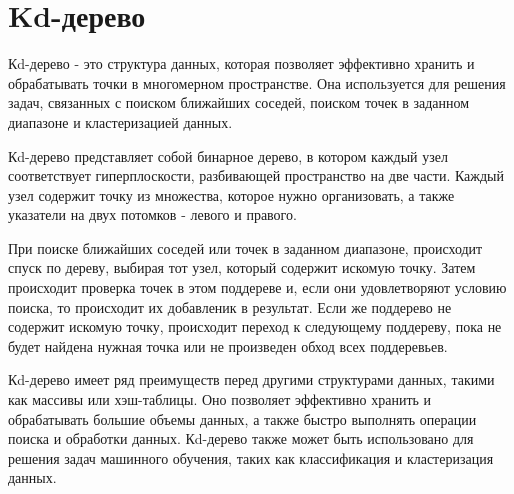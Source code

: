 

\section{Kd-дерево}


Кd-дерево - это структура данных, которая позволяет эффективно хранить и обрабатывать точки в многомерном пространстве. Она используется для решения задач, связанных с поиском ближайших соседей, поиском точек в заданном диапазоне и кластеризацией данных.

Кd-дерево представляет собой бинарное дерево, в котором каждый узел соответствует гиперплоскости, разбивающей пространство на две части. Каждый узел содержит точку из множества, которое нужно организовать, а также указатели на двух потомков - левого и правого.

При поиске ближайших соседей или точек в заданном диапазоне, происходит спуск по дереву, выбирая тот узел, который содержит искомую точку. Затем происходит проверка точек в этом поддереве и, если они удовлетворяют условию поиска, то происходит их добавленик в результат. Если же поддерево не содержит искомую точку, происходит переход к следующему поддереву, пока не будет найдена нужная точка или не произведен обход всех поддеревьев.

Кd-дерево имеет ряд преимуществ перед другими структурами данных, такими как массивы или хэш-таблицы. Оно позволяет эффективно хранить и обрабатывать большие объемы данных, а также быстро выполнять операции поиска и обработки данных. Кd-дерево также может быть использовано для решения задач машинного обучения, таких как классификация и кластеризация данных.

